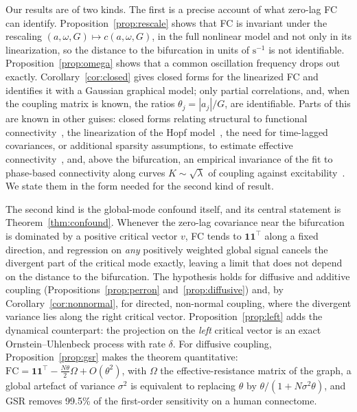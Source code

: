 \documentclass[aip,cha,reprint,amsmath,amssymb]{revtex4-2}
\theoremstyle{remark}
\newcommand{\one}{\mathbf 1}
\newcommand{\FC}{\mathrm{FC}}
\begin{document}
Our results are of two kinds. The first is a precise account of what zero-lag FC can identify. Proposition~\ref{prop:rescale} shows that FC is invariant under the rescaling $(a,\omega,G)\mapsto c(a,\omega,G)$, in the full nonlinear model and not only in its linearization, so the distance to the bifurcation in units of $\mathrm{s}^{-1}$ is not identifiable. Proposition~\ref{prop:omega} shows that a common oscillation frequency drops out exactly. Corollary~\ref{cor:closed} gives closed forms for the linearized FC and identifies it with a Gaussian graphical model; only partial correlations, and, when the coupling matrix is known, the ratios $\theta_j=|a_j|/G$, are identifiable. Parts of this are known in other guises: closed forms relating structural to functional connectivity~\cite{Galan2008,Saggio2016,Abdelnour2014}, the linearization of the Hopf model~\cite{PonceAlvarez2024}, the need for time-lagged covariances, or additional sparsity assumptions, to estimate effective connectivity~\cite{Gilson2016,Schiefer2018}, and, above the bifurcation, an empirical invariance of the fit to phase-based connectivity along curves $K\sim\sqrt\lambda$ of coupling against excitability~\cite{Alexandersen2025}. We state them in the form needed for the second kind of result.

The second kind is the global-mode confound itself, and its central statement is Theorem~\ref{thm:confound}. Whenever the zero-lag covariance near the bifurcation is dominated by a positive critical vector $v$, FC tends to $\one\one^\top$ along a fixed direction, and regression on \emph{any} positively weighted global signal cancels the divergent part of the critical mode exactly, leaving a limit that does not depend on the distance to the bifurcation. The hypothesis holds for diffusive and additive coupling (Propositions~\ref{prop:perron} and~\ref{prop:diffusive}) and, by Corollary~\ref{cor:nonnormal}, for directed, non-normal coupling, where the divergent variance lies along the right critical vector. Proposition~\ref{prop:left} adds the dynamical counterpart: the projection on the \emph{left} critical vector is an exact Ornstein--Uhlenbeck process with rate $\delta$. For diffusive coupling, Proposition~\ref{prop:gsr} makes the theorem quantitative: $\FC=\one\one^\top-\tfrac{N\theta}{2}\Omega+O(\theta^2)$, with $\Omega$ the effective-resistance matrix of the graph, a global artefact of variance $\sigma^2$ is equivalent to replacing $\theta$ by $\theta/(1+N\sigma^2\theta)$, and GSR removes 99.5\% of the first-order sensitivity on a human connectome.
\end{document}
